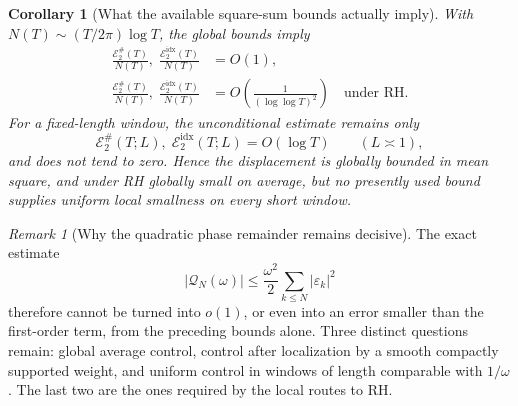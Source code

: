 \documentclass[11pt]{amsart}
\numberwithin{equation}{section}
\theoremstyle{plain}
\newtheorem{corollary}[theorem]{Corollary}
\theoremstyle{definition}
\theoremstyle{remark}
\newtheorem{remark}[theorem]{Remark}
\newcommand{\1}{\mathbf{1}}
\begin{document}
\begin{corollary}[What the available square-sum bounds actually imply]
\label{cor:rvm_square_sum_interpretation}
With \(N(T)\sim (T/2\pi)\log T\), the global bounds imply
\begin{align}
\frac{\mathscr E_2^{\#}(T)}{N(T)},\;
\frac{\mathscr E_2^{\mathrm{idx}}(T)}{N(T)}
&=O(1),
\label{eq:rvm_global_mean_square_unconditional}
\\
\frac{\mathscr E_2^{\#}(T)}{N(T)},\;
\frac{\mathscr E_2^{\mathrm{idx}}(T)}{N(T)}
&=O\!\left(\frac1{(\log\log T)^2}\right)
\quad\text{under RH}.
\label{eq:rvm_global_mean_square_RH}
\end{align}
For a fixed-length window, the unconditional estimate remains only
\begin{equation}
\mathscr E_2^{\#}(T;L),\;
\mathscr E_2^{\mathrm{idx}}(T;L)=O(\log T)
\qquad(L\asymp1),
\label{eq:rvm_fixed_window_square_sum}
\end{equation}
and does not tend to zero.  Hence the displacement is globally bounded in
mean square, and under RH globally small on average, but no presently used
bound supplies uniform local smallness on every short window.
\end{corollary}

\begin{remark}[Why the quadratic phase remainder remains decisive]
\label{rem:rvm_quadratic_remainder_decisive}
The exact estimate
\begin{equation}
|\mathcal Q_N(\omega)|
\leq
\frac{\omega^2}{2}
\sum_{k\leq N}|\varepsilon_k|^2
\label{eq:rvm_quadratic_remainder_recalled}
\end{equation}
therefore cannot be turned into \(o(1)\), or even into an error smaller
than the first-order term, from the preceding bounds alone.  Three distinct
questions remain: global average control, control after localization by a
smooth compactly supported weight, and uniform control in windows of length
comparable with \(1/\omega\).  The last two are the ones required by the
local routes to RH.
\end{remark}
\end{document}
